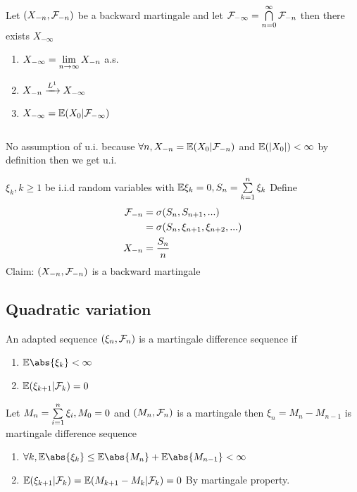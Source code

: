 \begin{thm}
\label{BMCT} Let $(X_{-n}, \mathcal{F}_{-n})$ be a backward martingale and let $\mathcal{F}_{-\infty} = \bigcap\limits_{n=0}^\infty \mathcal{F}_{-n}$ then there exists $X_{-\infty}$ \begin{enumerate}
    \item $X_{-\infty} = \lim\limits_{n\rightarrow \infty} X_{-n}$ a.s.
    \item $X_{-n} \xrightarrow{L^{1}} X_{-\infty}$
    \item $X_{-\infty} = \mathbb{E}(X_0 | \mathcal{F}_{-\infty})$
\end{enumerate}
\begin{equation*}
     \qquad 
\end{equation*}

\begin{rem}
No assumption of u.i. because $\forall n, X_{-n} = \mathbb{E}(X_0|\mathcal{F}_{-n})$ and $\mathbb{E}(|X_0|) <\infty$ by definition then we get u.i.
\end{rem}
\end{thm}
\begin{example}
$\xi_k, k \geq 1$ be i.i.d random variables with $\mathbb{E} \xi_k = 0, S_n = \sum\limits_{k=1}^n \xi_k$ Define \begin{align*}
    \mathcal{F}_{-n} &= \sigma(S_n, S_{n+1}, ...) \\
    &= \sigma(S_n, \xi_{n+1},\xi_{n+2}, ...) \\
    X_{-n} &= \frac{S_n}{n}
\end{align*}Claim: $(X_{-n}, \mathcal{F}_{-n})$ is a backward martingale
\end{example}

\newpage
\subsection{Quadratic variation}
\begin{dfn}
An adapted sequence $(\xi_n ,\mathcal{F}_n)$ is a martingale difference sequence if \begin{enumerate}
    \item $ \E\abs{\xi_k} < \infty$
    \item $\mathbb{E}(\xi_{k+1}|\mathcal{F}_k) = 0$
\end{enumerate}
\end{dfn}
\begin{example}
Let $M_n =\sum\limits_{i=1}^n \xi_i, M_0 = 0$ and $(M_n, \mathcal{F}_n)$ is a martingale then $\xi_n = M_n - M_{n-1}$ is martingale difference sequence
\begin{enumerate}
    \item $\forall k, \E\abs{\xi_k} \leq \E\abs{M_n} +\E\abs{M_{n-1}} <\infty$
    \item $\mathbb{E}(\xi_{k+1}|\mathcal{F}_k) = \mathbb{E}(M_{k+1} - M_{k}|\mathcal{F}_k) = 0$ By martingale property.
\end{enumerate}
\end{example}
\vspace{2cm}

